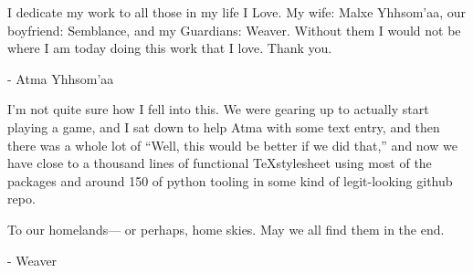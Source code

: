 \begin{multicols}{2}
I dedicate my work to all those in my life I Love.  My wife: Malxe Yhhsom'aa, our boyfriend: Semblance, and my Guardians: Weaver.  Without them I would not be where I am today doing this work that I love.  Thank you. \pc%

- {\ferrum Atma Yhhsom'aa}\pw%

I'm not quite sure how I fell into this. We were gearing up to actually start playing a game, and I sat down to help Atma with some text entry, and then there was a whole lot of ``Well, this would be better if we did that,'' and now we have close to a thousand lines of functional \TeX stylesheet using most of the packages and around 150 of python tooling in some kind of legit-looking github repo.\pc%

To our homelands--- or perhaps, home skies. May we all find them in the end.\pc%

- {\ferrum Weaver}%
\end{multicols}
